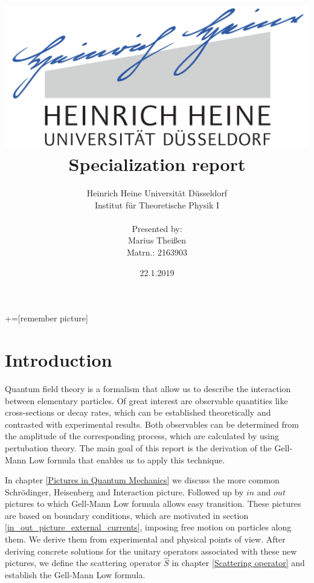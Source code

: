 \documentclass[12pt, titlepage]{article}
\title{\includegraphics[scale=0.07]{logo}\\Specialization report}
\date{22.1.2019}
\author{ Heinrich Heine Universit\"at D\"usseldorf\\ Institut f\"ur Theoretische Physik I\\  \\Presented by:\\Marius Thei\ss{}en\\ Matrn.: 2163903 \\  }
\begin{document}
+=[remember picture]
\everymath{\displaystyle}

\maketitle %
\tableofcontents
\newpage
\section{Introduction}\label{Introduction}
Quantum field theory is a formalism that allow us to describe the interaction between elementary particles. Of great interest are observable quantities like cross-sections or decay rates, which can be established theoretically and contrasted with experimental results. Both observables can be determined from the amplitude of the corresponding process, which are calculated by using pertubation theory. The main goal of this report is the derivation of the Gell-Mann Low formula that enables us  to apply this technique.
 
In chapter \ref{Pictures in Quantum Mechanics} we discuss the more common Schrödinger, Heisenberg and Interaction picture. Followed up by $ in $ and $ out $ pictures to which Gell-Mann Low formula allows easy transition. These pictures are based on boundary conditions, which are motivated in section \ref{in_out_picture_external_currents}, imposing free motion on particles along them. We derive them from experimental and physical points of view. After deriving concrete solutions for the unitary operators associated with these new pictures, we define the scattering operator $ \hat{S} $ in chapter \ref{Scattering operator} and establish the Gell-Mann Low formula.
\end{document}
